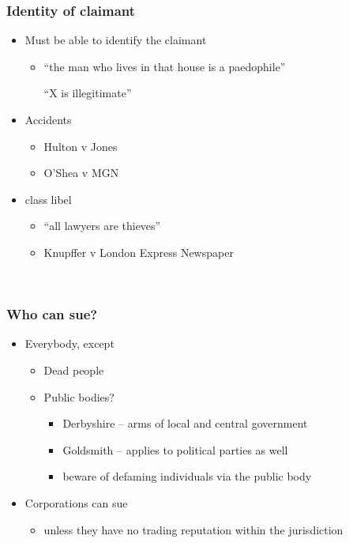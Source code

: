\documentclass[ignorenonframetext,]{beamer}
\begin{document}
\begin{frame}
\frametitle{Identity of claimant}

\begin{itemize}
\item  Must be able to identify the claimant

  \begin{itemize}
  \item    ``the man who lives in that house is a paedophile''

    ``X is illegitimate''
  \end{itemize}
\item  Accidents

  \begin{itemize}
  \item    Hulton v Jones 
  \item    O'Shea v MGN
  \end{itemize}
\item  class libel 

  \begin{itemize}
  \item    ``all lawyers are thieves''
  \item    Knupffer v London Express Newspaper
  \end{itemize}
\end{itemize}

~


\end{frame}

\begin{frame}
\frametitle{Who can sue?}

\begin{itemize}
\item  Everybody, except

  \begin{itemize}
  \item    Dead people
  \item    Public bodies?

    \begin{itemize}
    \item {Derbyshire}{ -- arms of local and central government}
    \item {Goldsmith}{ -- applies to political parties as well}
    \item {beware of defaming individuals via the public body}
    \end{itemize}
  \end{itemize}
\item  {Corporations can sue}

  \begin{itemize}
  \item    {unless they have no trading reputation within the
    jurisdiction}
  \end{itemize}
\end{itemize}
\end{frame}
\end{document}
